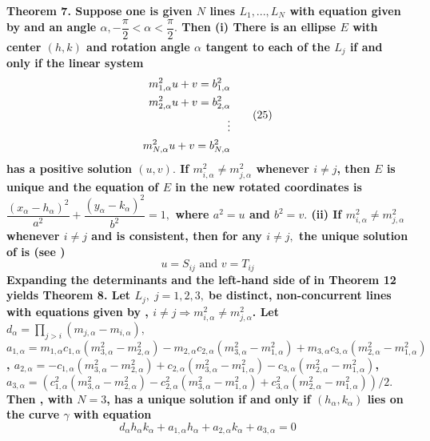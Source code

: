 \bf Theorem 7. \rm  Suppose one is given $N$ lines $L_{1},...,L_{N}$ with equation given by  and an angle $\alpha ,-\dfrac{\pi }{2}<\alpha <\dfrac{\pi }{2}.$ Then \newline (i) There is an ellipse $E$ with center $(h,k)$ and rotation angle $\alpha $ tangent to each of the $L_{j}$ if and only if the linear system $$\split m_{1,\alpha}^{2}u+v=b_{1,\alpha}^{2}\\ m_{2,\alpha}^{2}u+v=b_{2,\alpha}^{2}\\ \vdots\\ m_{N,\alpha}^{2}u+v=b_{N,\alpha}^{2}\endsplit\tag{25}$$ has a positive solution $(u,v).$ If $m_{i,\alpha }^{2}\neq m_{j,\alpha }^{2}$ whenever $i\neq j$, then $E$ is unique and the equation of $E$ in the new rotated coordinates is $\dfrac{(x_{\alpha }-h_{\alpha })^{2}}{a^{2}}+\dfrac{(y_{\alpha }-k_{\alpha })^{2}}{b^{2}}=1,$ where $a^{2}=u$ and $b^{2}=v.$ (ii) If $m_{i,\alpha }^{2}\neq m_{j,\alpha }^{2}$ whenever $i\neq j$ and  is consistent, then for any $i\neq j,$ the unique solution of  is (see ) $$u=S_{ij}\text{ and }v=T_{ij}\tag{26}$$ Expanding the determinants and the left-hand side of  in Theorem 12 yields \nl \nl
\bf Theorem 8. \rm  Let $L_{j},\;j=1,2,3,\;$be distinct, non-concurrent lines with equations given by ,  $i\neq j\Rightarrow m_{i,\alpha }^{2}\neq m_{j,\alpha }^{2}$. Let $d_{\alpha }=\prod\limits_{j>i}(m_{j,\alpha }-m_{i,\alpha }),$ \newline 
$a_{1,\alpha }=m_{1,\alpha }c_{1,\alpha }\left( m_{3,\alpha }^{2}-m_{2,\alpha }^{2}\right) -m_{2,\alpha }c_{2,\alpha }\left( m_{3,\alpha }^{2}-m_{1,\alpha }^{2}\right) +m_{3,\alpha }c_{3,\alpha }\left( m_{2,\alpha }^{2}-m_{1,\alpha }^{2}\right) $, \newline
$a_{2,\alpha }=-c_{1,\alpha }\left( m_{3,\alpha }^{2}-m_{2,\alpha }^{2}\right) +c_{2,\alpha }\left( m_{3,\alpha }^{2}-m_{1,\alpha }^{2}\right) -c_{3,\alpha }\left( m_{2,\alpha }^{2}-m_{1,\alpha }^{2}\right) $, \newline
$a_{3,\alpha }=(c_{1,\alpha }^{2}(m_{3,\alpha }^{2}-m_{2,\alpha }^{2})-c_{2,\alpha }^{2}(m_{3,\alpha }^{2}-m_{1,\alpha }^{2})+c_{3,\alpha }^{2}(m_{2,\alpha }^{2}-m_{1,\alpha }^{2}))/2.$ \newline Then , 
with $N=3$, has a unique solution if and only if $(h_{\alpha },k_{\alpha })$ lies on the curve $\gamma $ with equation $$d_{\alpha }h_{\alpha }k_{\alpha }+a_{1,\alpha }h_{\alpha }+a_{2,\alpha }k_{\alpha }+a_{3,\alpha }=0\tag{27}$$ \nl \nl
